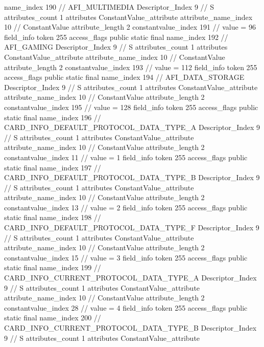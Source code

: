 {{{{{				name_index	190		// AFI_MULTIMEDIA
				Descriptor_Index	9		// S
				attributes_count	1
				attributes {
				ConstantValue_attribute {
					attribute_name_index	10		// ConstantValue
					attribute_length	2
					constantvalue_index	191		// value = 96
				}
				}
			}
			field_info {
				token	255
				access_flags	public static final
				name_index	192		// AFI_GAMING
				Descriptor_Index	9		// S
				attributes_count	1
				attributes {
				ConstantValue_attribute {
					attribute_name_index	10		// ConstantValue
					attribute_length	2
					constantvalue_index	193		// value = 112
				}
				}
			}
			field_info {
				token	255
				access_flags	public static final
				name_index	194		// AFI_DATA_STORAGE
				Descriptor_Index	9		// S
				attributes_count	1
				attributes {
				ConstantValue_attribute {
					attribute_name_index	10		// ConstantValue
					attribute_length	2
					constantvalue_index	195		// value = 128
				}
				}
			}
			field_info {
				token	255
				access_flags	public static final
				name_index	196		// CARD_INFO_DEFAULT_PROTOCOL_DATA_TYPE_A
				Descriptor_Index	9		// S
				attributes_count	1
				attributes {
				ConstantValue_attribute {
					attribute_name_index	10		// ConstantValue
					attribute_length	2
					constantvalue_index	11		// value = 1
				}
				}
			}
			field_info {
				token	255
				access_flags	public static final
				name_index	197		// CARD_INFO_DEFAULT_PROTOCOL_DATA_TYPE_B
				Descriptor_Index	9		// S
				attributes_count	1
				attributes {
				ConstantValue_attribute {
					attribute_name_index	10		// ConstantValue
					attribute_length	2
					constantvalue_index	13		// value = 2
				}
				}
			}
			field_info {
				token	255
				access_flags	public static final
				name_index	198		// CARD_INFO_DEFAULT_PROTOCOL_DATA_TYPE_F
				Descriptor_Index	9		// S
				attributes_count	1
				attributes {
				ConstantValue_attribute {
					attribute_name_index	10		// ConstantValue
					attribute_length	2
					constantvalue_index	15		// value = 3
				}
				}
			}
			field_info {
				token	255
				access_flags	public static final
				name_index	199		// CARD_INFO_CURRENT_PROTOCOL_DATA_TYPE_A
				Descriptor_Index	9		// S
				attributes_count	1
				attributes {
				ConstantValue_attribute {
					attribute_name_index	10		// ConstantValue
					attribute_length	2
					constantvalue_index	28		// value = 4
				}
				}
			}
			field_info {
				token	255
				access_flags	public static final
				name_index	200		// CARD_INFO_CURRENT_PROTOCOL_DATA_TYPE_B
				Descriptor_Index	9		// S
				attributes_count	1
				attributes {
				ConstantValue_attribute {
}}}}}}}
